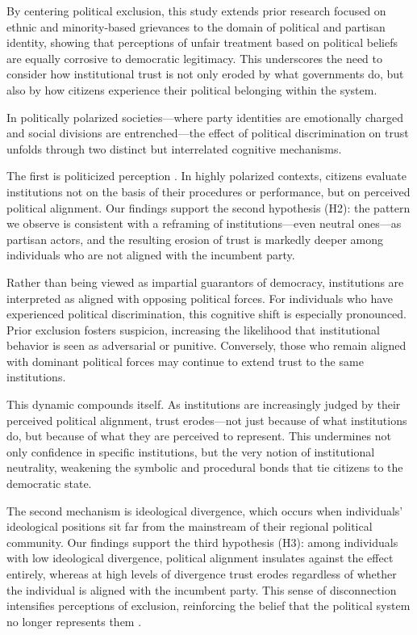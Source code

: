 \documentclass{article}
\begin{document}
By centering political exclusion, this study extends prior research focused on ethnic and minority-based grievances \parencite{wilkes_immigration_2019, tyrberg_impact_2024} to the domain of political and partisan identity, showing that perceptions of unfair treatment based on political beliefs are equally corrosive to democratic legitimacy. This underscores the need to consider how institutional trust is not only eroded by what governments do, but also by how citizens experience their political belonging within the system.

In politically polarized societies—where party identities are emotionally charged and social divisions are entrenched—the effect of political discrimination on trust unfolds through two distinct but interrelated cognitive mechanisms.

The first is politicized perception \parencite{hetherington_why_2015}. In highly polarized contexts, citizens evaluate institutions not on the basis of their procedures or performance, but on perceived political alignment. Our findings support the second hypothesis (H2): the pattern we observe is consistent with a reframing of institutions—even neutral ones—as partisan actors, and the resulting erosion of trust is markedly deeper among individuals who are not aligned with the incumbent party.

Rather than being viewed as impartial guarantors of democracy, institutions are interpreted as aligned with opposing political forces. For individuals who have experienced political discrimination, this cognitive shift is especially pronounced. Prior exclusion fosters suspicion, increasing the likelihood that institutional behavior is seen as adversarial or punitive. Conversely, those who remain aligned with dominant political forces may continue to extend trust to the same institutions.

This dynamic compounds itself. As institutions are increasingly judged by their perceived political alignment, trust erodes—not just because of what institutions do, but because of what they are perceived to represent. This undermines not only confidence in specific institutions, but the very notion of institutional neutrality, weakening the symbolic and procedural bonds that tie citizens to the democratic state.

The second mechanism is ideological divergence, which occurs when individuals' ideological positions sit far from the mainstream of their regional political community. Our findings support the third hypothesis (H3): among individuals with low ideological divergence, political alignment insulates against the effect entirely, whereas at high levels of divergence trust erodes regardless of whether the individual is aligned with the incumbent party. This sense of disconnection intensifies perceptions of exclusion, reinforcing the belief that the political system no longer represents them \parencite{mccoy_polarization_2018, iyengar_fear_2015}.
\end{document}
